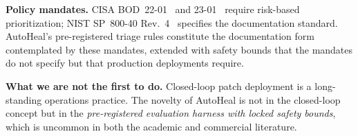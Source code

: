 \textbf{Policy mandates.} CISA BOD~22-01~\cite{cisa2021bod2201}
and 23-01~\cite{cisa2022bod2301} require risk-based prioritization;
NIST SP~800-40 Rev.~4~\cite{nist2022sp80040r4} specifies the
documentation standard. AutoHeal's pre-registered triage rules
constitute the documentation form contemplated by these mandates,
extended with safety bounds that the mandates do not specify but
that production deployments require.

\textbf{What we are not the first to do.} Closed-loop patch
deployment is a long-standing operations practice. The novelty of
AutoHeal is not in the closed-loop concept but in the
\emph{pre-registered evaluation harness with locked safety bounds},
which is uncommon in both the academic and commercial literature.
